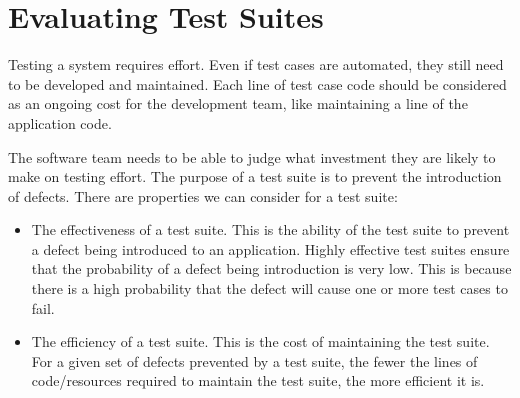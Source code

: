\documentclass[a4paper, openany]{memoir}
\begin{document}
\chapter{Evaluating Test Suites}
Testing a system requires effort. Even if test cases are automated, they still need to be developed and maintained. Each line of test case code should be considered as an ongoing cost for the development team, like maintaining a line of the application code.

The software team needs to be able to judge what investment they are likely to make on testing effort. The purpose of a test suite is to prevent the introduction of defects. There are properties we can consider for a test suite:
\begin{itemize}
    \item The effectiveness of a test suite. This is the ability of the test suite to prevent a defect being introduced to an application. Highly effective test suites ensure that the probability of a defect being introduction is very low. This is because there is a high probability that the defect will cause one or more test cases to fail.
    
    \item The efficiency of a test suite. This is the cost of maintaining the test suite. For a given set of defects prevented by a test suite, the fewer the lines of code/resources required to maintain the test suite, the more efficient it is.
\end{itemize}
\end{document}
